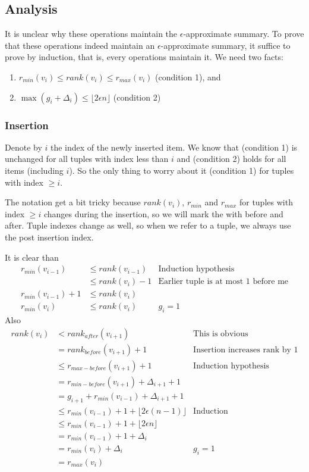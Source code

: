\documentclass{article}
\begin{document}
\subsection*{Analysis}
It is unclear why these operations maintain the $\epsilon$-approximate summary. To prove that these operations indeed maintain an $\epsilon$-approximate summary, it suffice to prove by induction, that is, every operations maintain it. We need two facts:

\begin{enumerate}
  \item $ {r_{min}(v_i) \le rank(v_i) \le r_{max}(v_i)} $ (condition 1), and
  \item $ \max(g_i + \Delta_i) \leq \lfloor 2\epsilon n \rfloor $ (condition 2)
\end{enumerate}

\subsubsection*{Insertion}
Denote by $ i $ the index of the newly inserted item. We know that (condition 1) is unchanged for all tuples with index less than $ i $ and (condition 2) holds for all items (including $ i $). So the only thing to worry about it (condition 1) for tuples with index $ \ge i $.

The notation get a bit tricky because $ rank(v_i) $, $ r_{min} $ and $ r_{max} $ for tuples with index $ \ge i $ changes during the insertion, so we will mark the with before and after. Tuple indexes change as well, so when we refer to a tuple, we always use the post insertion index.

It is clear than 
\begin{align*}
    r_{min}(v_{i-1}) &\le rank(v_{i-1}) & \text{Induction hypothesis} \\
                     &\le rank(v_i) - 1 & \text{Earlier tuple is at most 1 before me} \\
r_{min}(v_{i-1}) + 1 &\le rank(v_i) \\
     r_{min}(v_{i})  &\le rank(v_i) & g_i = 1
\end{align*}
Also 
\begin{align*}
rank(v_i) & <     rank_{after}(v_{i+1})  & \text{This is obvious} \\
          & =     rank_{before}(v_{i+1}) + 1 & \text{Insertion increases rank by 1} \\
          & \leq  r_{max-before}(v_{i+1}) + 1 & \text{Induction hypothesis} \\
          & =     r_{min-before}(v_{i+1}) + \Delta_{i+1} + 1 \\
          & =     g_{i+1} + r_{min}(v_{i-1}) + \Delta_{i+1} + 1 \\
          & \leq     r_{min}(v_{i-1}) + 1 + \lfloor 2\epsilon (n-1 )\rfloor & \text{Induction} \\
          & \leq     r_{min}(v_{i-1}) + 1 + \lfloor 2\epsilon n \rfloor \\
          & =        r_{min}(v_{i-1}) + 1 + \Delta_i \\
          & =     r_{min}(v_i) + \Delta_i & g_i = 1 \\
          & =     r_{max}(v_i)
\end{align*}
\end{document}
